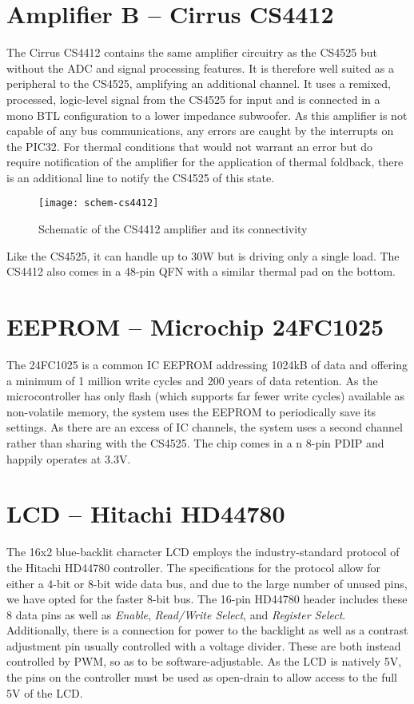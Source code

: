 \section{Amplifier B -- Cirrus CS4412}
The Cirrus CS4412 contains the same amplifier circuitry as the CS4525 but without the ADC and signal processing features. It is therefore well suited as a peripheral to the CS4525, amplifying an additional channel. It uses a remixed, processed, logic-level signal from the CS4525 for input and is connected in a mono BTL configuration to a lower impedance subwoofer. As this amplifier is not capable of any bus communications, any errors are caught by the interrupts on the PIC32. For thermal conditions that would not warrant an error but do require notification of the amplifier for the application of thermal foldback, there is an additional line to notify the CS4525 of this state. 
\begin{figure}[H]
	\centering
	\texttt{[image: schem-cs4412]}
	\caption[Schematic -- Cirrus CS4412]%
	{Schematic of the CS4412 amplifier and its connectivity}
\end{figure}
Like the CS4525, it can handle up to 30W but is driving only a single load. The CS4412 also comes in a 48-pin QFN with a similar thermal pad on the bottom.

\section{EEPROM -- Microchip 24FC1025}
\label{sec:eeprom}
The 24FC1025 is a common IC EEPROM addressing 1024kB of data and offering a minimum of 1 million write cycles and 200 years of data retention. As the microcontroller has only flash (which supports far fewer write cycles) available as non-volatile memory, the system uses the EEPROM to periodically save its settings. As there are an excess of IC channels, the system uses a second channel rather than sharing with the CS4525. The chip comes in a n 8-pin PDIP and happily operates at 3.3V. 

\section{LCD -- Hitachi HD44780}
\label{sec:lcd}
The 16x2 blue-backlit character LCD employs the industry-standard protocol of the Hitachi HD44780 controller. The specifications for the protocol allow for either a 4-bit or 8-bit wide data bus, and due to the large number of unused pins, we have opted for the faster 8-bit bus. The 16-pin HD44780 header includes these 8 data pins as well as \emph{Enable}, \emph{Read/Write Select}, and \emph{Register Select}. Additionally, there is a connection for power to the backlight as well as a contrast adjustment pin usually controlled with a voltage divider. These are both instead controlled by PWM, so as to be software-adjustable. As the LCD is natively 5V, the pins on the controller must be used as open-drain to allow access to the full 5V of the LCD.

